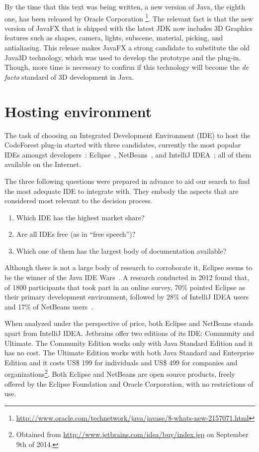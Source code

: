 By the time that this text was being written, a new version of Java, the eighth
one, has been released by Oracle Corporation
\footnote{\url{http://www.oracle.com/technetwork/java/javase/8-whats-new-2157071.html}}.
The relevant fact is that the new version of JavaFX that is shipped with the
latest JDK now includes 3D Graphics features such as shapes, camera, lights,
subscene, material, picking, and antialiasing. This release makes JavaFX a
strong candidate to substitute the old Java3D technology, which was used to
develop the prototype and the plug-in. Though, more time is necessary to confirm
if this technology will become the \textit{de facto} standard of 3D development
in Java.

\section{Hosting environment}\label{sec:ide-choice}

The task of choosing an Integrated Development Environment (IDE) to host the
CodeForest plug-in started with three candidates, currently the most popular
IDEs amongst developers~\cite{furmankiewicz2008eclipse}:
Eclipse~\cite{eclipse2014eclipse}, NetBeans~\cite{netbeans2014netbeans}, and
IntelliJ IDEA~\cite{jetbrains2014intellij}; all of them available on the
Internet.

The three following questions were prepared in advance to aid our search to find
the most adequate IDE to integrate with. They embody the aspects that are
considered most relevant to the decision process.
\begin{enumerate}
  \item Which IDE has the highest market share?
  \item Are all IDEs free (as in ``free speech'')?
  \item Which one of them has the largest body of documentation available?
\end{enumerate}

Although there is not a large body of research to corroborate it, Eclipse seems
to be the winner of the Java IDE Wars~\cite{geer2005eclipse}. A research
conducted in 2012 found that, of 1800 participants that took part in an online
survey, 70\% pointed Eclipse as their primary development environment, followed
by 28\% of IntelliJ IDEA users and 17\% of NetBeans
users~\cite{rebel2012productivity}.

When analyzed under the perspective of price, both Eclipse and NetBeans stands
apart from IntelliJ IDEA. Jetbrains offer two editions of its IDE: Community and
Ultimate. The Community Edition works only with Java Standard Edition and it
has no cost. The Ultimate Edition works with both Java Standard and
Enterprise Edition and it costs US\$ 199 for individuals and US\$
499 for companies and organizations\footnote{Obtained from
\url{http://www.jetbrains.com/idea/buy/index.jsp} on September 9th of
2014.}.
Both Eclipse and NetBeans are open source products, freely offered by the
Eclipse Foundation and Oracle Corporation, with no restrictions of use.

